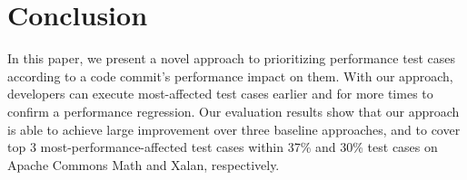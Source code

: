 	\vspace{-0.2cm}
\section{Conclusion}
\label{sec:conclusion}
	\vspace{-0.1cm}
	
In this paper, we present a novel approach to prioritizing performance test cases according to a code commit's performance impact on them. With our approach, developers can execute most-affected test cases earlier and for more times to confirm a performance regression. Our evaluation results show that our approach is able to achieve large improvement over three baseline approaches, and to cover top 3 most-performance-affected test cases within 37\% and 30\% test cases on Apache Commons Math and Xalan, respectively. 



